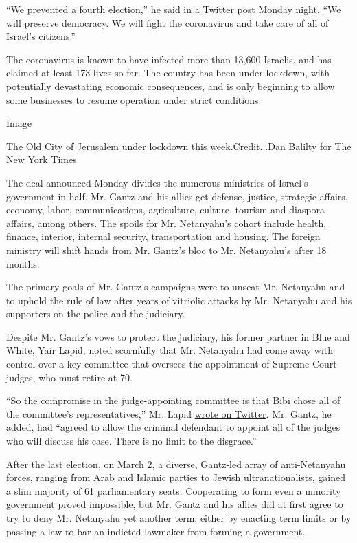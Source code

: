 ``We prevented a fourth election,'' he said in a
\href{https://twitter.com/gantzbe/status/1252276044620607488?s=08}{Twitter
post} Monday night. ``We will preserve democracy. We will fight the
coronavirus and take care of all of Israel's citizens.''

The coronavirus is known to have infected more than 13,600 Israelis, and
has claimed at least 173 lives so far. The country has been under
lockdown, with potentially devastating economic consequences, and is
only beginning to allow some businesses to resume operation under strict
conditions.

Image

The Old City of Jerusalem under lockdown this week.Credit...Dan Balilty
for The New York Times

The deal announced Monday divides the numerous ministries of Israel's
government in half. Mr. Gantz and his allies get defense, justice,
strategic affairs, economy, labor, communications, agriculture, culture,
tourism and diaspora affairs, among others. The spoils for Mr.
Netanyahu's cohort include health, finance, interior, internal security,
transportation and housing. The foreign ministry will shift hands from
Mr. Gantz's bloc to Mr. Netanyahu's after 18 months.

The primary goals of Mr. Gantz's campaigns were to unseat Mr. Netanyahu
and to uphold the rule of law after years of vitriolic attacks by Mr.
Netanyahu and his supporters on the police and the judiciary.

Despite Mr. Gantz's vows to protect the judiciary, his former partner in
Blue and White, Yair Lapid, noted scornfully that Mr. Netanyahu had come
away with control over a key committee that oversees the appointment of
Supreme Court judges, who must retire at 70.

``So the compromise in the judge-appointing committee is that Bibi chose
all of the committee's representatives,'' Mr. Lapid
\href{https://twitter.com/yairlapid/status/1252261985556877312?s=20}{wrote
on Twitter}. Mr. Gantz, he added, had ``agreed to allow the criminal
defendant to appoint all of the judges who will discuss his case. There
is no limit to the disgrace.''

After the last election, on March 2, a diverse, Gantz-led array of
anti-Netanyahu forces, ranging from Arab and Islamic parties to Jewish
ultranationalists, gained a slim majority of 61 parliamentary seats.
Cooperating to form even a minority government proved impossible, but
Mr. Gantz and his allies did at first agree to try to deny Mr. Netanyahu
yet another term, either by enacting term limits or by passing a law to
bar an indicted lawmaker from forming a government.

